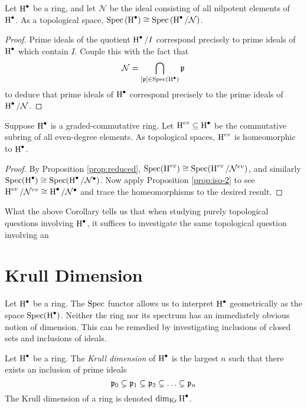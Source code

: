 \begin{proposition} \label{prop:reduced}
  Let $\operatorname{H}^\bullet$ be a ring, and let $\mathcal{N}$ be the ideal consisting of all nilpotent elements of $\operatorname{H}^\bullet$. As a topological space, $\operatorname{Spec} \left(\operatorname{H}^\bullet\right) \cong \operatorname{Spec} \left( \operatorname{H}^\bullet / \mathcal{N} \right)$.
\end{proposition}
\begin{proof}
  Prime ideals of the quotient $\operatorname{H}^\bullet / I$ correspond precisely to prime ideals of $\operatorname{H}^\bullet$ which contain $I$. Couple this with the fact that \[\mathcal{N} = \bigcap_{[\mathfrak{p}] \in \operatorname{Spec}(\operatorname{H}^\bullet)} \mathfrak{p}\] to deduce that prime ideals of $\operatorname{H}^\bullet$ correspond precisely to the prime ideals of $\operatorname{H}^\bullet / \mathcal{N}$.
  
\end{proof}
\begin{corollary}
  Suppose $\operatorname{H}^\bullet$ is a graded-commutative ring. Let $\operatorname{H}^{ev} \subseteq \operatorname{H}^\bullet$ be the commutative subring of all even-degree elements. As topological spaces, $\operatorname{H}^{ev}$ is homeomorphic to $\operatorname{H}^\bullet$.
\end{corollary}
\begin{proof}
  By Proposition \ref{prop:reduced}, $\operatorname{Spec}(\operatorname{H}^{ev}) \cong \operatorname{Spec}(\operatorname{H}^{ev}/\mathcal{N}^{ev})$, and similarly $\operatorname{Spec}(\operatorname{H}^\bullet) \cong \operatorname{Spec}(\operatorname{H}^\bullet/\mathcal{N}^\bullet)$. Now apply Proposition \ref{prop:iso-2} to see $\operatorname{H}^{ev} / \mathcal{N}^{ev} \cong \operatorname{H}^\bullet / \mathcal{N}^\bullet$ and trace the homeomorphisms to the desired result.
\end{proof}

What the above Corollary tells us that when studying purely topological questions involving $\operatorname{H}^\bullet$, it suffices to investigate the same topological question involving an 
\section{Krull Dimension}
\label{sec:krull}

Let $\operatorname{H}^\bullet$ be a ring. The $\operatorname{Spec}$ functor allows us to interpret $\operatorname{H}^\bullet$ geometrically as the space $\operatorname{Spec}(\operatorname{H}^\bullet)$. Neither the ring nor its spectrum has an immediately obvious notion of dimension. This can be remedied by investigating inclusions of closed sets and inclusions of ideals.

\begin{definition} Let $\operatorname{H}^\bullet$ be a ring. The \emph{Krull dimension} of $\operatorname{H}^\bullet$ is the largest $n$ such that there exists an inclusion of prime ideals
    \begin{equation}
      \label{eq:krull-ideals}
      \mathfrak{p}_0 \subsetneq \mathfrak{p}_1 \subsetneq \mathfrak{p}_2 \subsetneq \ldots \subsetneq \mathfrak{p}_n
    \end{equation}
    The Krull dimension of a ring is denoted $\dim_{\operatorname{Kr}} \operatorname{H}^\bullet$.
\end{definition}

